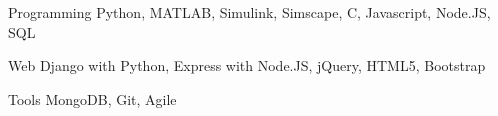 


\begin{cvskills}


\cvskill
{Programming} %
{Python, MATLAB, Simulink, Simscape, C, Javascript, Node.JS, SQL} %


\cvskill
{Web} %
{Django with Python, Express with Node.JS, jQuery, HTML5, Bootstrap} %


\cvskill
{Tools}
{MongoDB, Git, Agile}



\end{cvskills}